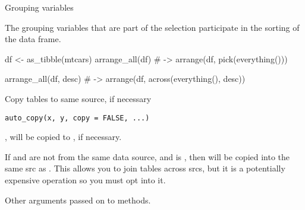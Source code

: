 \documentclass[a4paper]{book}
\begin{document}
%
\begin{Section}{Grouping variables}


The grouping variables that are part of the selection participate
in the sorting of the data frame.
\end{Section}
%
\begin{Examples}
\begin{ExampleCode}
df <- as_tibble(mtcars)
arrange_all(df)
# ->
arrange(df, pick(everything()))

arrange_all(df, desc)
# ->
arrange(df, across(everything(), desc))
\end{ExampleCode}
\end{Examples}
%
\begin{Description}
Copy tables to same source, if necessary
\end{Description}
%
\begin{Usage}
\begin{verbatim}
auto_copy(x, y, copy = FALSE, ...)
\end{verbatim}
\end{Usage}
%
\begin{Arguments}
\begin{ldescription}
\item[\code{x}, \code{y}]  will be copied to , if necessary.

\item[\code{copy}] If  and  are not from the same data source,
and  is , then  will be copied into the
same src as .  This allows you to join tables across srcs, but
it is a potentially expensive operation so you must opt into it.

\item[\code{...}] Other arguments passed on to methods.
\end{ldescription}
\end{Arguments}
\end{document}
